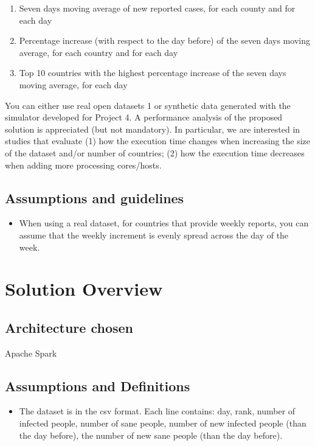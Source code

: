 \documentclass[table, 12pt]{article}
\begin{document}
\begin{enumerate}


\item Seven days moving average of new reported cases, for each county and for each day
\item Percentage increase (with respect to the day before) of the seven days moving average, for each country
and for each day
\item Top 10 countries with the highest percentage increase of the seven days moving average, for each day
\end{enumerate}
You can either use real open datasets 1 or synthetic data generated with the simulator developed for Project 4.
A performance analysis of the proposed solution is appreciated (but not mandatory). In particular, we are
interested in studies that evaluate (1) how the execution time changes when increasing the size of the dataset
and/or number of countries; (2) how the execution time decreases when adding more processing cores/hosts.

\subsection{Assumptions and guidelines}
 \begin{itemize}
 

 
 \item
When using a real dataset, for countries that provide weekly reports, you can assume that the weekly increment is evenly spread across the day of the week.

 \end{itemize}



\section{Solution Overview}
\subsection{Architecture chosen}
Apache Spark



\subsection{Assumptions and Definitions}
\begin{itemize}


\setlength\itemsep{-0.5em}
	\item The dataset is in the csv format. Each line contains: day, rank, number of infected people, number of sane people, number of new infected people (than the day before), the number of new sane people (than the day before).
\end{itemize}
\end{document}
